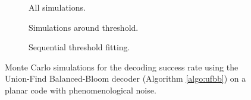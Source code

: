 \begin{figure}[htbp]
  \centering
  \begin{subfigure}[b]{\textwidth}
    \begin{adjustbox}{Clip=0 1em 0 0}
    
    \end{adjustbox}
    \caption{All simulations.}
  \end{subfigure}
  \begin{subfigure}[b]{0.49\textwidth}
    \begin{adjustbox}{Clip=0 1em 0 0}
      
    \end{adjustbox}
    \caption{Simulations around threshold.}
  \end{subfigure}
  \begin{subfigure}[b]{0.49\textwidth}
    \begin{adjustbox}{Clip=0 1em 0 0}
      
    \end{adjustbox}
    \caption{Sequential threshold fitting.}
  \end{subfigure}
  \caption{Monte Carlo simulations for the decoding success rate using the Union-Find Balanced-Bloom decoder (Algorithm \ref{algo:ufbb}) on a planar code with phenomenological noise.}
  \label{fig:thres_ufbb_planar_3d}
\end{figure}